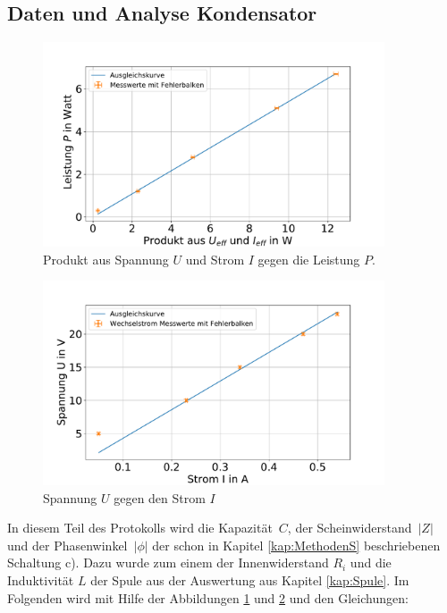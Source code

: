 \FloatBarrier
\subsection{Daten und Analyse Kondensator}


\begin{figure}
	\centering
	\includegraphics[width=0.9\textwidth]{res/PgegenUIK.pdf}
	\caption{Produkt aus Spannung $U$ und Strom $I$ gegen die Leistung $P$.}
	\label{fig:PgegenUIK}
\end{figure}


\begin{figure}
	\centering
	\includegraphics[width=0.9\textwidth]{res/UgegenIK.pdf}
	\caption{Spannung $U$ gegen den Strom $I$}
	\label{fig:UgegenIK}
\end{figure}


In diesem Teil des Protokolls wird die Kapazität~$C$, der Scheinwiderstand~$|Z|$ und der Phasenwinkel~$|\phi| $ der schon in Kapitel \ref{kap:MethodenS} beschriebenen Schaltung c). 
Dazu wurde zum einem der Innenwiderstand $R_i$ und die Induktivität $L$ der Spule aus der Auswertung aus Kapitel \ref{kap:Spule}.
Im Folgenden wird mit Hilfe der Abbildungen \ref{fig:PgegenUIK} und \ref{fig:UgegenIK}
und den Gleichungen:

